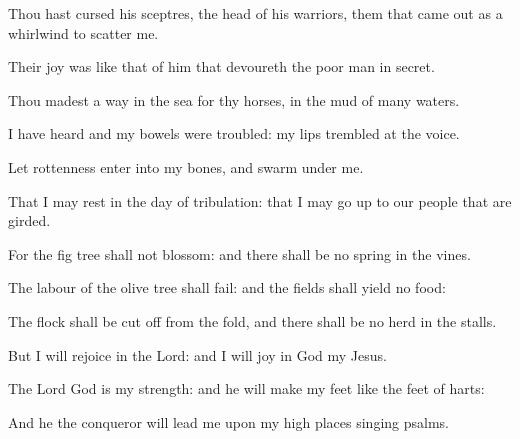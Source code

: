 \item Thou hast cursed his sceptres, the head of his warriors, them that came out as a whirlwind to scatter me.
\item Their joy was like that of him that devoureth the poor man in secret.
\item Thou madest a way in the sea for thy horses, in the mud of many waters.
\item I have heard and my bowels were troubled: my lips trembled at the voice.
\item Let rottenness enter into my bones, and swarm under me.
\item That I may rest in the day of tribulation: that I may go up to our people that are girded.
\item For the fig tree shall not blossom: and there shall be no spring in the vines.
\item The labour of the olive tree shall fail: and the fields shall yield no food:
\item The flock shall be cut off from the fold, and there shall be no herd in the stalls.
\item But I will rejoice in the Lord: and I will joy in God my Jesus.
\item The Lord God is my strength: and he will make my feet like the feet of harts:
\item And he the conqueror will lead me upon my high places singing psalms.
